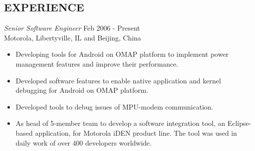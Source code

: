 \documentclass[line,margin]{res}
\begin{document}
\begin{resume}
                \section{EXPERIENCE} {\sl Senior Software Engineer} \hfill Feb 2006 - Present \\
                Motorola, Libertyville, IL and Beijing, China
                \begin{itemize}  \itemsep -2pt %
                \item Developing tools for Android on OMAP platform to implement power management
                  features and improve their performance.
                \item Developed software features to enable native application and kernel debugging
                  for Android on OMAP platform.
                \item Developed tools to debug issues of MPU-modem communication.
                \item As head of 5-member team to develop a software integration tool, 
                  an Eclipse-based application, for Motorola iDEN product line. The tool 
                  was used in daily work of over 400 developers worldwide.
                \end{itemize}
 

\end{resume}
\end{document}
